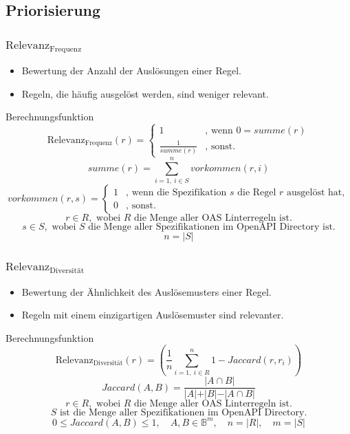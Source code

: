 \subsection{Priorisierung}
\begin{frame}
  \frametitle{$\text{Relevanz}_\text{Frequenz}$}
  \vspace{-0.4cm}
  \begin{itemize}
    \item Bewertung der Anzahl der Auslösungen einer Regel.
    \item Regeln, die häufig ausgelöst werden, sind weniger relevant.
  \end{itemize}
  \begin{greyblock}{Berechnungsfunktion}
    \scriptsize{
      \[
        \text{Relevanz}_\text{Frequenz}(r) = 
        \begin{cases}
        1&\text{, wenn } 0 =  summe(r)\\
        \frac{1}{summe(r)}&\text{, sonst}.
        \end{cases}
      \]
      \[
        summe(r) = \sum_{i=1, \: i \in S}^{n}vorkommen(r, i)
      \]
      \[
        vorkommen(r, s) = 
        \begin{cases} 
        1&\text{, wenn die Spezifikation } s \text{ die Regel } r \text{ ausgelöst hat}, \\
        0&\text{, sonst}.
        \end{cases}
      \]
      \[
        r \in R, \text{ wobei $R$ die Menge aller OAS Linterregeln ist.}
      \]
      \[
       s \in S, \text{ wobei $S$ die Menge aller Spezifikationen im OpenAPI Directory ist.}
      \]
      \[
        n = \vert S \vert
      \]
    }
  \end{greyblock}
\end{frame}

\begin{frame}
  \frametitle{$\text{Relevanz}_\text{Diversität}$}
  \vspace{-0.6cm}
  \begin{itemize}
    \item Bewertung der Ähnlichkeit des Auslösemusters einer Regel.
    \item Regeln mit einem einzigartigen Auslösemuster sind relevanter.
  \end{itemize}
  \begin{greyblock}{Berechnungsfunktion}
    \scriptsize{
      \[
        \text{Relevanz}_\text{Diversität}(r) = (\frac{1}{n} \sum_{i=1, \: i \in R}^{n} 1- Jaccard(r, r_i))
      \]
      \[
        Jaccard(A,B)=\frac{\vert A \cap B \vert}{\vert A \vert + \vert B \vert - \vert A \cap B \vert}
      \]
      \[
        r \in R, \text{ wobei $R$ die Menge aller OAS Linterregeln ist.}
      \]
      \[
       S \text{ ist die Menge aller Spezifikationen im OpenAPI Directory.}
      \]
      \[
      0 \leq Jaccard(A, B) \leq 1, \quad A, B \in \mathbb{B}^m, \quad n = \vert R \vert, \quad m = \vert S \vert
      \]
    }
  \end{greyblock}
\end{frame}  

